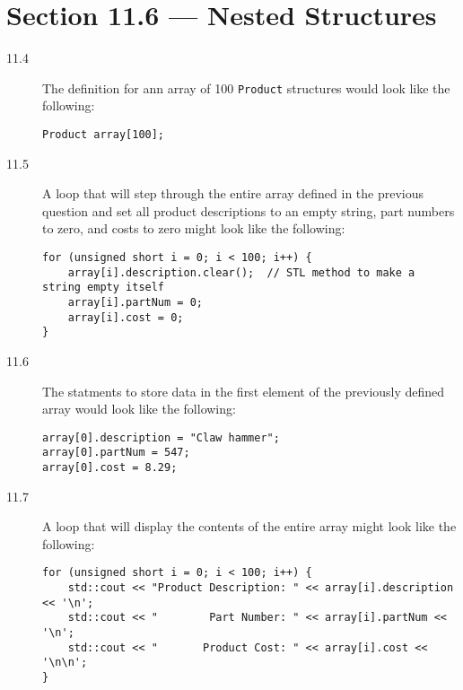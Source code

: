 \documentclass[11pt]{article}
\begin{document}
\section*{Section 11.6 --- Nested Structures}
\begin{description}

    \item[11.4] The definition for ann array of 100 \lstinline{Product} structures would look like the following:
    \begin{lstlisting}
Product array[100];
\end{lstlisting}

    \item[11.5] A loop that will step through the entire array defined in the previous question and set all product descriptions to an empty string, part numbers to zero, and costs to zero might look like the following:
    \begin{lstlisting}
for (unsigned short i = 0; i < 100; i++) {
    array[i].description.clear();  // STL method to make a string empty itself
    array[i].partNum = 0;
    array[i].cost = 0;
}
\end{lstlisting}

    \item[11.6] The statments to store data in the first element of the previously defined array would look like the following:
    \begin{lstlisting}
array[0].description = "Claw hammer";
array[0].partNum = 547;
array[0].cost = 8.29;
\end{lstlisting}

    \item[11.7] A loop that will display the contents of the entire array might look like the following:
    \begin{lstlisting}
for (unsigned short i = 0; i < 100; i++) {
    std::cout << "Product Description: " << array[i].description << '\n';
    std::cout << "        Part Number: " << array[i].partNum << '\n';
    std::cout << "       Product Cost: " << array[i].cost << '\n\n';
}
\end{lstlisting}

\end{description}
\end{document}
